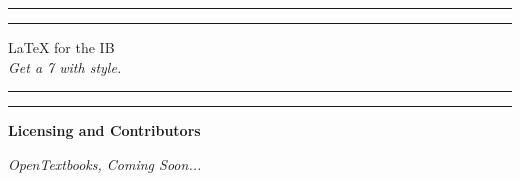 \documentclass[12pt,a4paper]{article}
\begin{document}

\begin{titlepage}
\centering %
\scshape %
\vfill

\rule{\textwidth}{1.6pt}\vspace*{-\baselineskip}\vspace*{2pt}
\rule{\textwidth}{0.4pt}

\vspace{1.5\baselineskip} %
\LARGE{\LaTeX{} for the IB}\\
\vspace{0.2\baselineskip}
\small{\textit{Get a 7 with style.}}
\vspace{0.75\baselineskip} %

\rule{\textwidth}{0.4pt}\vspace*{-\baselineskip}\vspace{3.2pt}
\rule{\textwidth}{1.6pt}

\vfill
\end{titlepage}



\begin{center}
\Large{\textbf{Licensing and Contributors}}

\vfill
\small{\textit{OpenTextbooks, Coming Soon\texttrademark...}}
\vfill

\newpage
\end{center}

\begin{center}
\tableofcontents
\newpage
\end{center}




\newpage


\newpage

\end{document}
